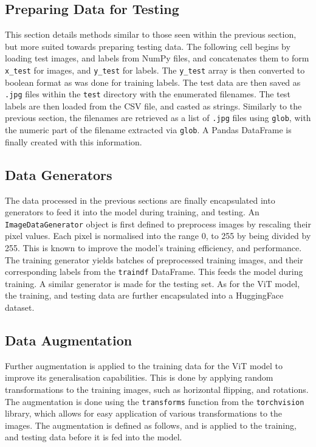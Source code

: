 \documentclass[../main]{subfiles}
\begin{document}
\subsection{Preparing Data for Testing}
This section details methods similar to those seen within the previous section,
but more suited towards preparing testing data. The following cell begins by
loading test images, and labels from NumPy files, and concatenates them to form
\texttt{x\_test} for images, and \texttt{y\_test} for labels. The
\texttt{y\_test} array is then converted to boolean format as was done for
training labels. The test data are then saved as \texttt{.jpg} files within
the \texttt{test} directory with the enumerated filenames. The test labels are then
loaded from the CSV file, and casted as strings. Similarly to the previous
section, the filenames are retrieved as a list of \texttt{.jpg} files using
\texttt{glob}, with the numeric part of the filename extracted via
\texttt{glob}. A Pandas DataFrame is finally created with this information.

\subsection{Data Generators}
The data processed in the previous sections are finally encapsulated into
generators to feed it into the model during training, and testing. An
\texttt{ImageDataGenerator} object is first defined to preprocess images by
rescaling their pixel values. Each pixel is normalised into the range 0, to
255 by being divided by 255. This is known to improve the model's training
efficiency, and performance. The training generator yields batches of
preprocessed training images, and their corresponding labels from the
\texttt{traindf} DataFrame. This feeds the model during training. A similar
generator is made for the testing set. As for the ViT model, the training, and
testing data are further encapsulated into a HuggingFace dataset.

\subsection{Data Augmentation}
Further augmentation is applied to the training data for the ViT model to
improve its generalisation capabilities. This is done by applying random
transformations to the training images, such as horizontal flipping, and
rotations. The augmentation is done using the \texttt{transforms} function from
the \texttt{torchvision} library, which allows for easy application of various
transformations to the images. The augmentation is defined as follows, and is
applied to the training, and testing data before it is fed into the model.
\end{document}
